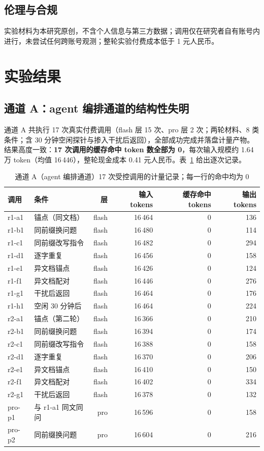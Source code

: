 \documentclass[11pt, a4paper]{ctexart}
\begin{document}
\subsection{伦理与合规}
实验材料为本研究原创，不含个人信息与第三方数据；调用仅在研究者自有账号内进行，未尝试任何跨账号观测；整轮实验付费成本低于 1 元人民币。

\section{实验结果}
\label{sec:results}

\subsection{通道 A：agent 编排通道的结构性失明}
\label{sec:results-a}

通道 A 共执行 17 次真实付费调用（flash 层 15 次、pro 层 2 次；两轮材料、8 类条件；含 30 分钟空闲探针与掺入干扰后返回），全部成功完成并落盘计量产物。结果高度一致：\textbf{17 次调用的缓存命中 token 数全部为 0}，每次输入规模约 1.64 万 token（均值 16\,446），整轮现金成本 0.41 元人民币。表~\ref{tab:channela} 给出逐次记录。

\begin{table}[t]
\centering
\small
\caption{通道 A（agent 编排通道）17 次受控调用的计量记录；每一行的命中均为 0}
\label{tab:channela}
\begin{tabular}{l l r r r r}
\toprule
调用 & 条件 & 层 & 输入 tokens & 缓存命中 tokens & 输出 tokens \\
\midrule
r1-a1 & 锚点（同文档） & flash & 16\,464 & 0 & 136 \\
r1-b1 & 同前缀换问题 & flash & 16\,480 & 0 & 114 \\
r1-c1 & 同前缀改写指令 & flash & 16\,482 & 0 & 294 \\
r1-d1 & 逐字重复 & flash & 16\,456 & 0 & 158 \\
r1-e1 & 异文档锚点 & flash & 16\,426 & 0 & 124 \\
r1-f1 & 异文档配对 & flash & 16\,446 & 0 & 276 \\
r1-g1 & 干扰后返回 & flash & 16\,464 & 0 & 176 \\
r1-h1 & 空闲 30 分钟后 & flash & 16\,464 & 0 & 224 \\
r2-a1 & 锚点（第二轮） & flash & 16\,366 & 0 & 210 \\
r2-b1 & 同前缀换问题 & flash & 16\,394 & 0 & 174 \\
r2-c1 & 同前缀改写指令 & flash & 16\,388 & 0 & 158 \\
r2-d1 & 逐字重复 & flash & 16\,370 & 0 & 206 \\
r2-e1 & 异文档锚点 & flash & 16\,410 & 0 & 150 \\
r2-f1 & 异文档配对 & flash & 16\,402 & 0 & 334 \\
r2-g1 & 干扰后返回 & flash & 16\,378 & 0 & 132 \\
pro-p1 & 与 r1-a1 同文同问 & pro & 16\,596 & 0 & 158 \\
pro-p2 & 同前缀换问题 & pro & 16\,604 & 0 & 216 \\
\bottomrule
\end{tabular}
\end{table}
\end{document}
